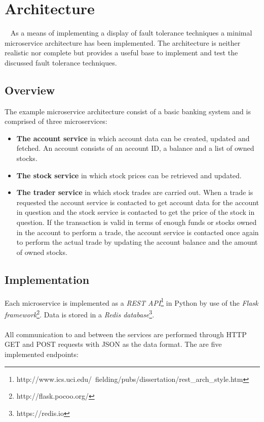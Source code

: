 \section{Architecture}~\label{sec:architecture}
As a means of implementing a display of fault tolerance techniques a
minimal microservice architecture has been implemented. The
architecture is neither realistic nor complete but provides a useful
base to implement and test the discussed fault tolerance techniques.

\subsection{Overview}
The example microservice architecture consist of a basic banking
system and is comprised of three microservices:

\begin{itemize}
\item \textbf{The account service} in which account data can be
  created, updated and fetched. An account consists of an account ID,
  a balance and a list of owned stocks.
\item \textbf{The stock service} in which stock prices can be
  retrieved and updated.
\item \textbf{The trader service} in which stock trades are carried
  out. When a trade is requested the account service is contacted to
  get account data for the account in question  and the stock service
  is contacted to get the price of the stock in question. If the
  transaction is valid in terms of enough funds or stocks owned in the
  account to perform a trade, the account service is contacted once
  again to perform the actual trade by updating the account balance
  and the amount of owned stocks.
\end{itemize}

\subsection{Implementation}
Each microservice is implemented as a \textit{REST
API}\footnote{http://www.ics.uci.edu/~fielding/pubs/dissertation/rest\_arch\_style.htm}
in Python by use of the \textit{Flask
framework}\footnote{http://flask.pocoo.org/}. Data is stored in a \textit{Redis
database}\footnote{https://redis.io}.
\\\\
All communication to and between the services are performed through
HTTP GET and POST requests with JSON as the data format. The are five
implemented endpoints:


